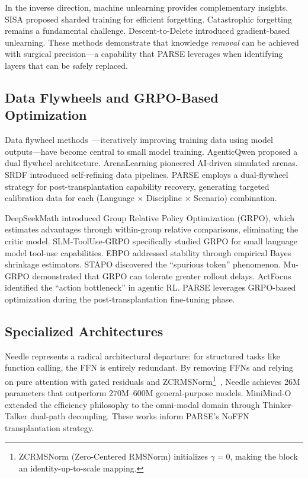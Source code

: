 \documentclass[twocolumn]{article}
\begin{document}
In the inverse direction, machine unlearning provides complementary insights.
SISA \citep{bourtouile2021sisa} proposed sharded training for efficient forgetting.
Catastrophic forgetting \citep{french1999catastrophic} remains a fundamental challenge.
Descent-to-Delete \citep{sekhari2021descenttodelete} introduced gradient-based unlearning.
These methods demonstrate that knowledge \emph{removal} can be achieved with surgical precision---a capability that PARSE leverages when identifying layers that can be safely replaced.

\subsection{Data Flywheels and GRPO-Based Optimization}

Data flywheel methods~\citep{nvidia2024flywheel}---iteratively improving training data using model outputs---have become central to small model training.
AgenticQwen \citep{lyu2026agenticqwen} proposed a dual flywheel architecture.
ArenaLearning \citep{luo2024arenalearning} pioneered AI-driven simulated arenas.
SRDF \citep{wang2024srdf} introduced self-refining data pipelines.
PARSE employs a dual-flywheel strategy for post-transplantation capability recovery, generating targeted calibration data for each (Language $\times$ Discipline $\times$ Scenario) combination.

DeepSeekMath \citep{shao2024deepseekmath} introduced Group Relative Policy Optimization (GRPO), which estimates advantages through within-group relative comparisons, eliminating the critic model.
SLM-ToolUse-GRPO \citep{paprunia2025slmtooluse} specifically studied GRPO for small language model tool-use capabilities.
EBPO \citep{han2026ebpo} addressed stability through empirical Bayes shrinkage estimators.
STAPO \citep{liu2026stapo} discovered the ``spurious token'' phenomenon.
Mu-GRPO \citep{tian2026mugrpo} demonstrated that GRPO can tolerate greater rollout delays.
ActFocus \citep{he2026actfocus} identified the ``action bottleneck'' in agentic RL.
PARSE leverages GRPO-based optimization during the post-transplantation fine-tuning phase.

\subsection{Specialized Architectures}

Needle \citep{ndubuaku2026needle} represents a radical architectural departure: for structured tasks like function calling, the FFN is entirely redundant.
By removing FFNs and relying on pure attention with gated residuals and ZCRMSNorm\footnote{ZCRMSNorm (Zero-Centered RMSNorm) initializes $\gamma=0$, making the block an identity-up-to-scale mapping.}~\citep{ndubuaku2026needle}, Needle achieves 26M parameters that outperform 270M--600M general-purpose models.
MiniMind-O \citep{gong2026minimindo} extended the efficiency philosophy to the omni-modal domain through Thinker-Talker dual-path decoupling.
These works inform PARSE's NoFFN transplantation strategy.
\end{document}
